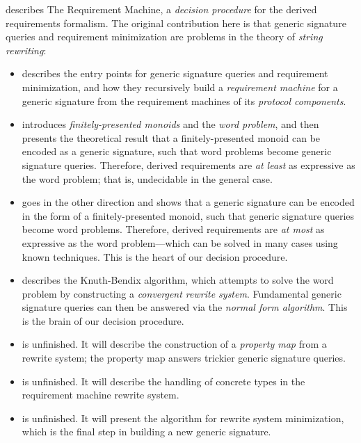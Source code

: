 \documentclass[../generics]{subfiles}
\begin{document}
 describes The Requirement Machine, a \emph{decision procedure} for the derived requirements formalism. The original contribution here is that generic signature queries and requirement minimization are problems in the theory of \emph{string rewriting}:
\begin{itemize}
\item {} describes the entry points for generic signature queries and requirement minimization, and how they recursively build a \emph{requirement machine} for a generic signature from the requirement machines of its \emph{protocol components}.

\item {} introduces \emph{finitely-presented monoids} and the \emph{word problem}, and then presents the theoretical result that a finitely-presented monoid can be encoded as a generic signature, such that word problems become generic signature queries. Therefore, derived requirements are \emph{at least} as expressive as the word problem; that is, undecidable in the general case.

\item {} goes in the other direction and shows that a generic signature can be encoded in the form of a finitely-presented monoid, such that generic signature queries become word problems. Therefore, derived requirements are \emph{at most} as expressive as the word problem---which can be solved in many cases using known techniques. This is the heart of our decision procedure.

\item {} describes the Knuth-Bendix algorithm, which attempts to solve the word problem by constructing a \emph{convergent rewrite system}. Fundamental generic signature queries can then be answered via the \emph{normal form algorithm}. This is the brain of our decision procedure.

\item {} is unfinished. It will describe the construction of a \emph{property map} from a rewrite system;  the property map answers trickier generic signature queries.

\item {} is unfinished. It will describe the handling of concrete types in the requirement machine rewrite system.

\item {} is unfinished. It will present the algorithm for rewrite system minimization, which is the final step in building a new generic signature.
\end{itemize}
\end{document}
